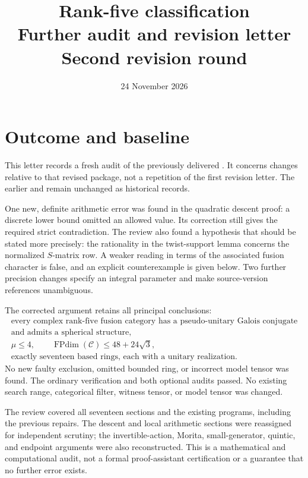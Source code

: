 \documentclass[11pt,a4paper]{article}
\title{Rank-five classification\\[4pt]\large Further audit and revision letter\\Second revision round}
\author{}
\date{24 November 2026}
\newcommand{\FPdim}{\operatorname{FPdim}}
\begin{document}
\maketitle

\section{Outcome and baseline}

This letter records a fresh audit of the previously delivered
. It concerns changes relative to
that revised package, not a repetition of the first revision letter.
The earlier  and
 remain unchanged as historical records.

One new, definite arithmetic error was found in the quadratic descent
proof: a discrete lower bound omitted an allowed value. Its correction
still gives the required strict contradiction. The review also found a
hypothesis that should be stated more precisely: the rationality in the
twist-support lemma concerns the normalized $S$-matrix row. A weaker
reading in terms of the associated fusion character is false, and an
explicit counterexample is given below. Two further precision changes
specify an integral parameter and make source-version references
unambiguous.

The corrected argument retains all principal conclusions:
\[
\begin{gathered}
\text{every complex rank-five fusion category has a pseudo-unitary
Galois conjugate}\\[-2pt]
\text{and admits a spherical structure},\\
\mu\le4,\qquad \FPdim(\mathcal C)\le48+24\sqrt3,\\
\text{exactly seventeen based rings, each with a unitary realization}.
\end{gathered}
\]
No new faulty exclusion, omitted bounded ring, or incorrect model tensor
was found. The ordinary verification and both optional audits passed.
No existing search range, categorical filter, witness tensor, or model
tensor was changed.

The review covered all seventeen sections and the existing programs,
including the previous repairs. The descent and local arithmetic
sections were reassigned for independent scrutiny; the invertible-action,
Morita, small-generator, quintic, and endpoint arguments were also
reconstructed. This is a mathematical and computational audit, not a
formal proof-assistant certification or a guarantee that no further
error exists.
\end{document}
